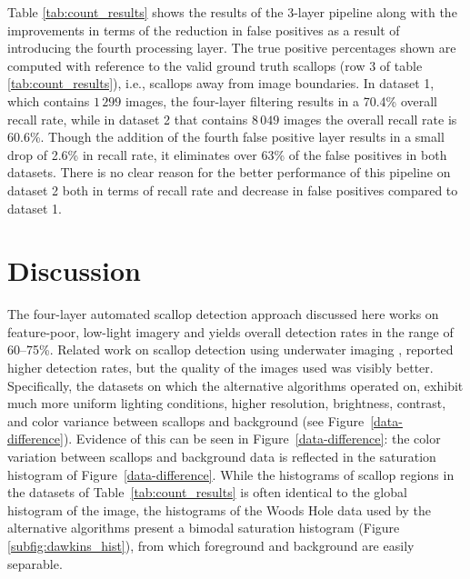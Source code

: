 Table \ref{tab:count_results} shows the results of the 3-layer pipeline along with the improvements in terms of the reduction in false positives as a result of introducing the fourth processing layer. 
The true positive percentages shown are computed with reference to the valid ground truth scallops (row 3 of table \ref{tab:count_results}), i.e., scallops away from image boundaries.  
In dataset 1, which contains $1\,299$ images, the four-layer filtering results in a 70.4\% overall recall rate, while in dataset 2 that contains $8\,049$ images the overall recall rate is 60.6\%.  Though the addition of the fourth false positive layer results in a small drop of 2.6\% in recall rate, it eliminates over 63\% of the false positives in both datasets.
There is no clear reason for the better performance of this pipeline on dataset 2 both in terms of recall rate and decrease in false positives compared to dataset 1.

\section{Discussion}

The four-layer automated scallop detection approach discussed
here works on feature-poor, low-light imagery and yields
overall detection rates in the range of 60--75\%. 
Related work on scallop detection using underwater imaging \cite{dawkins11,dawkings13},
reported higher detection rates, but the quality of the images used was visibly better.  Specifically,
the datasets on which the 
alternative algorithms \cite{dawkings13}
operated on, exhibit much more uniform lighting conditions, higher resolution,
brightness, contrast, and color variance between scallops and background 
(see Figure~\ref{data-difference}). 
Evidence of this can be seen in Figure~\ref{data-difference}: the color variation between scallops and background data is reflected in the
saturation histogram of Figure~\ref{data-difference}. While the histograms
of scallop regions in the datasets of Table~\ref{tab:count_results} is often 
identical to the global histogram of the image, the histograms of the Woods Hole data used by the alternative algorithms \cite{dawkings13} present a bimodal saturation histogram
(Figure \ref{subfig:dawkins_hist}), from which 
foreground and background are easily separable.



